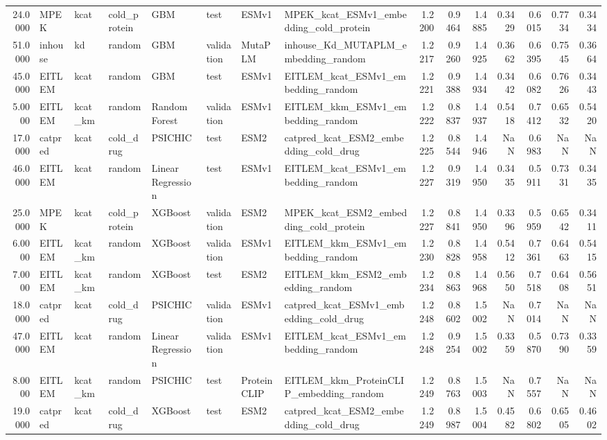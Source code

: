 \begin{tabular}{rlllllllrrrrrrr}
24.0000 & MPEK & kcat & cold_protein & GBM & test & ESMv1 & MPEK_kcat_ESMv1_embedding_cold_protein & 1.2200 & 0.9464 & 1.4885 & 0.3429 & 0.6015 & 0.7734 & 0.3434 \\
51.0000 & inhouse & kd & random & GBM & validation & MutaPLM & inhouse_Kd_MUTAPLM_embedding_random & 1.2217 & 0.9260 & 1.4925 & 0.3662 & 0.6395 & 0.7545 & 0.3664 \\
45.0000 & EITLEM & kcat & random & GBM & test & ESMv1 & EITLEM_kcat_ESMv1_embedding_random & 1.2221 & 0.9388 & 1.4934 & 0.3442 & 0.6082 & 0.7626 & 0.3443 \\
5.0000 & EITLEM & kcat_km & random & Random Forest & validation & ESMv1 & EITLEM_kkm_ESMv1_embedding_random & 1.2222 & 0.8837 & 1.4937 & 0.5418 & 0.7412 & 0.6532 & 0.5420 \\
17.0000 & catpred & kcat & cold_drug & PSICHIC & test & ESM2 & catpred_kcat_ESM2_embedding_cold_drug & 1.2225 & 0.8544 & 1.4946 & NaN & 0.6983 & NaN & NaN \\
46.0000 & EITLEM & kcat & random & Linear Regression & test & ESMv1 & EITLEM_kcat_ESMv1_embedding_random & 1.2227 & 0.9319 & 1.4950 & 0.3435 & 0.5911 & 0.7331 & 0.3435 \\
25.0000 & MPEK & kcat & cold_protein & XGBoost & validation & ESM2 & MPEK_kcat_ESM2_embedding_cold_protein & 1.2227 & 0.8841 & 1.4950 & 0.3396 & 0.5959 & 0.6542 & 0.3411 \\
6.0000 & EITLEM & kcat_km & random & XGBoost & validation & ESMv1 & EITLEM_kkm_ESMv1_embedding_random & 1.2230 & 0.8828 & 1.4958 & 0.5412 & 0.7361 & 0.6463 & 0.5415 \\
7.0000 & EITLEM & kcat_km & random & XGBoost & test & ESM2 & EITLEM_kkm_ESM2_embedding_random & 1.2234 & 0.8863 & 1.4968 & 0.5650 & 0.7518 & 0.6408 & 0.5651 \\
18.0000 & catpred & kcat & cold_drug & PSICHIC & validation & ESMv1 & catpred_kcat_ESMv1_embedding_cold_drug & 1.2248 & 0.8602 & 1.5002 & NaN & 0.7014 & NaN & NaN \\
47.0000 & EITLEM & kcat & random & Linear Regression & validation & ESMv1 & EITLEM_kcat_ESMv1_embedding_random & 1.2248 & 0.9254 & 1.5002 & 0.3359 & 0.5870 & 0.7390 & 0.3359 \\
8.0000 & EITLEM & kcat_km & random & PSICHIC & test & ProteinCLIP & EITLEM_kkm_ProteinCLIP_embedding_random & 1.2249 & 0.8763 & 1.5003 & NaN & 0.7557 & NaN & NaN \\
19.0000 & catpred & kcat & cold_drug & XGBoost & test & ESM2 & catpred_kcat_ESM2_embedding_cold_drug & 1.2249 & 0.8987 & 1.5004 & 0.4582 & 0.6802 & 0.6505 & 0.4602 \\

\end{tabular}
